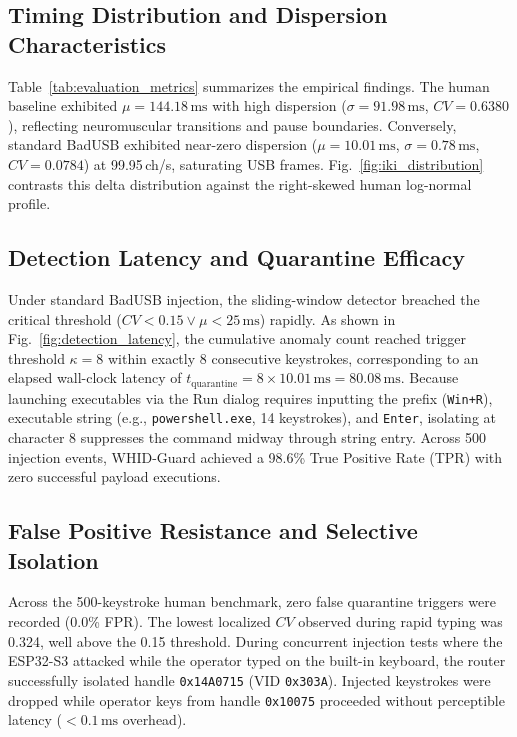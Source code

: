 \documentclass[conference]{IEEEtran}
\begin{document}
\subsection{Timing Distribution and Dispersion Characteristics}
Table~\ref{tab:evaluation_metrics} summarizes the empirical findings. The human baseline exhibited $\mu = 144.18\,\text{ms}$ with high dispersion ($\sigma = 91.98\,\text{ms}$, $CV = 0.6380$), reflecting neuromuscular transitions and pause boundaries. Conversely, standard BadUSB exhibited near-zero dispersion ($\mu = 10.01\,\text{ms}$, $\sigma = 0.78\,\text{ms}$, $CV = 0.0784$) at 99.95\,ch/s, saturating USB frames. Fig.~\ref{fig:iki_distribution} contrasts this delta distribution against the right-skewed human log-normal profile.

\subsection{Detection Latency and Quarantine Efficacy}
Under standard BadUSB injection, the sliding-window detector breached the critical threshold ($CV < 0.15 \lor \mu < 25\,\text{ms}$) rapidly. As shown in Fig.~\ref{fig:detection_latency}, the cumulative anomaly count reached trigger threshold $\kappa = 8$ within exactly 8 consecutive keystrokes, corresponding to an elapsed wall-clock latency of $t_{\text{quarantine}} = 8 \times 10.01\,\text{ms} = 80.08\,\text{ms}$. Because launching executables via the Run dialog requires inputting the prefix (\texttt{Win+R}), executable string (e.g., \texttt{powershell.exe}, 14 keystrokes), and \texttt{Enter}, isolating at character 8 suppresses the command midway through string entry. Across 500 injection events, WHID-Guard achieved a 98.6\% True Positive Rate (TPR) with zero successful payload executions.

\subsection{False Positive Resistance and Selective Isolation}
Across the 500-keystroke human benchmark, zero false quarantine triggers were recorded (0.0\% FPR). The lowest localized $CV$ observed during rapid typing was 0.324, well above the 0.15 threshold. During concurrent injection tests where the ESP32-S3 attacked while the operator typed on the built-in keyboard, the router successfully isolated handle \texttt{0x14A0715} (VID \texttt{0x303A}). Injected keystrokes were dropped while operator keys from handle \texttt{0x10075} proceeded without perceptible latency ($<0.1\,\text{ms}$ overhead).
\end{document}

